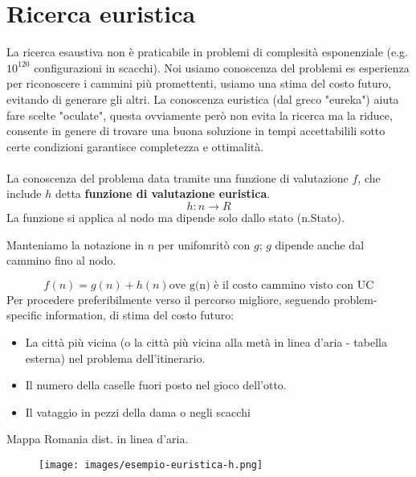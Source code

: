 \newpage
\section{Ricerca euristica}
La ricerca esaustiva non è praticabile in problemi di complesità esponenziale (e.g. $10^{120}$ configurazioni in scacchi). Noi usiamo
conoscenza del problemi es esperienza per riconoscere i cammini più promettenti, usiamo una stima del costo futuro, evitando di generare gli altri.
La conoscenza euristica (dal greco "eureka") aiuta fare scelte "oculate", questa ovviamente però non evita la ricerca ma la riduce, consente in
genere di trovare una buona soluzione in tempi accettabilili sotto certe condizioni garantisce completezza e ottimalità.\\\\
La conoscenza del problema data tramite una funzione di valutazione $f$, che include $h$ detta \textbf{funzione di valutazione euristica}.
$$h: n \to R$$
La funzione si applica al nodo ma dipende solo dallo stato (n.Stato).
\begin{note}
    Manteniamo la notazione in $n$ per unifomritò con $g$; $g$ dipende anche dal cammino fino al nodo.
\end{note}
$$f(n) = g(n) + h(n) \text{ove g(n) è il costo cammino visto con UC}$$
Per procedere preferibilmente verso il percorso migliore, seguendo problem-specific information, di stima del costo futuro:
\begin{itemize}
    \item La città più vicina (o la città più vicina alla metà in linea d'aria - tabella esterna) nel problema dell'itinerario.
    \item Il numero della caselle fuori posto nel gioco dell'otto.
    \item Il vataggio in pezzi della dama o negli scacchi
\end{itemize}

\begin{example}
    Mappa Romania dist. in linea d'aria.
    \begin{figure}[h!]
        \centering
        \texttt{[image: images/esempio-euristica-h.png]}
    \end{figure}
\end{example}

